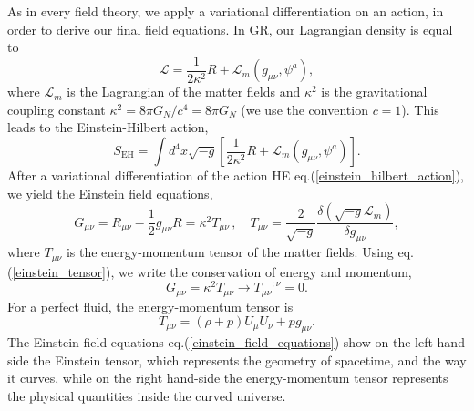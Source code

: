 \documentclass{book}
\begin{document}
	As in every field theory, we apply a variational differentiation on an action, in order to derive our final field equations. In GR, our Lagrangian density is equal to 
	\begin{equation}
		\label{lagrangian_density_he_action}
		\mathcal{L}=\frac{1}{2\kappa^2}R+\mathcal{L}_m(g_{\mu\nu},\psi^a),
	\end{equation}
	where $\mathcal{L}_m$ is the Lagrangian of the matter fields and $\kappa^2$ is the gravitational coupling constant $\kappa^2=8\pi G_N /c^4=8\pi G_N$ (we use the convention $c=1$). This leads to the Einstein-Hilbert action,
	\begin{equation}
		\label{einstein_hilbert_action}
		S_{\text{EH}}=\int d^4x \sqrt{-g}\left[ \frac{1}{2\kappa^2}R+\mathcal{L}_m(g_{\mu\nu},\psi^a) \right].
	\end{equation}
	After a variational differentiation of the action HE eq.(\ref{einstein_hilbert_action}), we yield the Einstein field equations,
	\begin{equation}
		\label{einstein_field_equations}
		G_{\mu\nu}=R_{\mu\nu}-\frac12 g_{\mu\nu}R = \kappa^2 T_{\mu\nu} \, , \quad T_{\mu\nu}=\frac{2}{\sqrt{-g}}\frac{\delta(\sqrt{-g}\mathcal{L}_m)}{\delta g_{\mu\nu}},
	\end{equation}
	where $T_{\mu\nu}$ is the energy-momentum tensor of the matter fields. Using eq.(\ref{einstein_tensor}), we write the conservation of energy and momentum,
	\begin{equation}
		\label{conservation_of_energy_momentum}
		G_{\mu\nu}=\kappa^2 T_{\mu\nu} \rightarrow {T_{\mu\nu}}^{;\nu}=0.
	\end{equation}
	For a perfect fluid, the energy-momentum tensor is
	\begin{equation}
		\label{perfect_fluid_tensor}
		T_{\mu\nu}=(\rho+p)U_\mu U_\nu +pg_{\mu\nu}.
	\end{equation}
	The Einstein field equations eq.(\ref{einstein_field_equations}) show on the left-hand side the Einstein tensor, which represents the geometry of spacetime, and the way it curves, while on the right hand-side the energy-momentum tensor represents the physical quantities inside the curved universe. 
	
\end{document}
